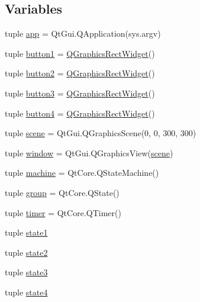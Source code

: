 \subsection*{Variables}
\begin{DoxyCompactItemize}
\item 
tuple \hyperlink{namespacemoveblocks_ab226ea92062e404c32529795624c87d7}{app} = Qt\+Gui.\+Q\+Application(sys.\+argv)
\item 
tuple \hyperlink{namespacemoveblocks_a38f50e2710ea27cf62af9fa3591708d5}{button1} = \hyperlink{classmoveblocks_1_1QGraphicsRectWidget}{Q\+Graphics\+Rect\+Widget}()
\item 
tuple \hyperlink{namespacemoveblocks_aa10ba442bc10206687f0ee04a05d42e9}{button2} = \hyperlink{classmoveblocks_1_1QGraphicsRectWidget}{Q\+Graphics\+Rect\+Widget}()
\item 
tuple \hyperlink{namespacemoveblocks_ad3643cf235ebca9c5c3d358b61d0f357}{button3} = \hyperlink{classmoveblocks_1_1QGraphicsRectWidget}{Q\+Graphics\+Rect\+Widget}()
\item 
tuple \hyperlink{namespacemoveblocks_af9c28d708b0133466b315980aa509e71}{button4} = \hyperlink{classmoveblocks_1_1QGraphicsRectWidget}{Q\+Graphics\+Rect\+Widget}()
\item 
tuple \hyperlink{namespacemoveblocks_a928c97a3867a13d50c13d5a30b34579a}{scene} = Qt\+Gui.\+Q\+Graphics\+Scene(0, 0, 300, 300)
\item 
tuple \hyperlink{namespacemoveblocks_aa360cd62b1b379bc2de58e36a26259b1}{window} = Qt\+Gui.\+Q\+Graphics\+View(\hyperlink{namespacemoveblocks_a928c97a3867a13d50c13d5a30b34579a}{scene})
\item 
tuple \hyperlink{namespacemoveblocks_a830418167a83dca9055e11b1eefd930a}{machine} = Qt\+Core.\+Q\+State\+Machine()
\item 
tuple \hyperlink{namespacemoveblocks_adbb5c3be2682eee3dda104f857c69d27}{group} = Qt\+Core.\+Q\+State()
\item 
tuple \hyperlink{namespacemoveblocks_a92306696512f100857e8b662404315bc}{timer} = Qt\+Core.\+Q\+Timer()
\item 
tuple \hyperlink{namespacemoveblocks_a8e1c834a71ba9250191429d31540ef86}{state1}
\item 
tuple \hyperlink{namespacemoveblocks_a922d3af2873d6ad9a2850cd45590299f}{state2}
\item 
tuple \hyperlink{namespacemoveblocks_a793c11cd3dec7747587440e41272ca5e}{state3}
\item 
tuple \hyperlink{namespacemoveblocks_ad8534e18a69faf0a521009c595d5516d}{state4}

\end{DoxyCompactItemize}
